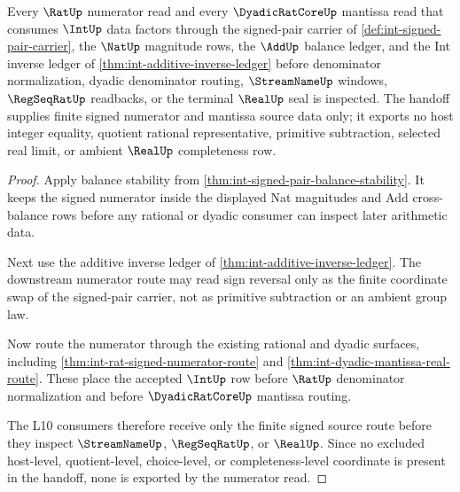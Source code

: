 \begin{theorem}
\label{thm:int-rat-numerator-handoff}
Every $\RatUp$ numerator read and every $\DyadicRatCoreUp$ mantissa read that
consumes $\IntUp$ data factors through the signed-pair carrier of
\autoref{def:int-signed-pair-carrier}, the $\NatUp$ magnitude rows, the
$\AddUp$ balance ledger, and the Int inverse ledger of
\autoref{thm:int-additive-inverse-ledger} before denominator normalization,
dyadic denominator routing, $\StreamNameUp$ windows, $\RegSeqRatUp$ readbacks,
or the terminal $\RealUp$ seal is inspected. The handoff supplies finite signed
numerator and mantissa source data only; it exports no host integer equality,
quotient rational representative, primitive subtraction, selected real limit,
or ambient $\RealUp$ completeness row.
\end{theorem}
\begin{proof}
Apply balance stability from
\autoref{thm:int-signed-pair-balance-stability}. It keeps the signed numerator
inside the displayed Nat magnitudes and Add cross-balance rows before any
rational or dyadic consumer can inspect later arithmetic data.

Next use the additive inverse ledger of
\autoref{thm:int-additive-inverse-ledger}. The downstream numerator route may
read sign reversal only as the finite coordinate swap of the signed-pair
carrier, not as primitive subtraction or an ambient group law.

Now route the numerator through the existing rational and dyadic surfaces,
including \autoref{thm:int-rat-signed-numerator-route} and
\autoref{thm:int-dyadic-mantissa-real-route}. These place the accepted
$\IntUp$ row before $\RatUp$ denominator normalization and before
$\DyadicRatCoreUp$ mantissa routing.

The L10 consumers therefore receive only the finite signed source route before
they inspect $\StreamNameUp$, $\RegSeqRatUp$, or $\RealUp$. Since no excluded
host-level, quotient-level, choice-level, or completeness-level coordinate is
present in the handoff, none is exported by the numerator read.
\end{proof}
